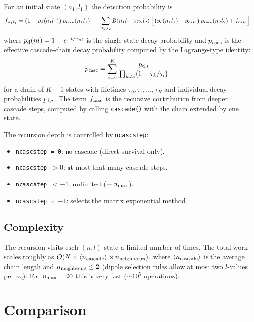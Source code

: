 \documentclass[11pt,a4paper]{article}
\begin{document}
For an initial state $(n_1,l_1)$ the detection probability is
\begin{equation}
  f_{n_1 l_1} = \bigl(1 - p_{\rm d}(n_1 l_1)\bigr)\,p_{\rm surv}(n_1 l_1)
  \;+\; \sum_{n_2,l_2} B(n_1 l_1 \!\to\! n_2 l_2)\;
  \Bigl[\bigl(p_{\rm d}(n_1 l_1) - p_{\rm casc}\bigr)\,p_{\rm surv}(n_2 l_2)
  + f_{\rm casc}\Bigr]
  \label{eq:recursive}
\end{equation}
where $p_{\rm d}(nl) = 1 - e^{-t/\tau_{nl}}$ is the single-state decay
probability and $p_{\rm casc}$ is the effective cascade-chain decay
probability computed by the Lagrange-type identity:
\begin{equation}
  p_{\rm casc} = \sum_{i=0}^{K} \frac{p_{{\rm d},i}}
  {\prod_{k \ne i}\bigl(1 - \tau_k/\tau_i\bigr)}
  \label{eq:pcasc}
\end{equation}
for a chain of $K{+}1$ states with lifetimes $\tau_0, \tau_1, \ldots,
\tau_K$ and individual decay probabilities $p_{{\rm d},i}$.
The term $f_{\rm casc}$ is the recursive contribution from deeper cascade
steps, computed by calling \texttt{cascade()} with the chain extended by
one state.

The recursion depth is controlled by \texttt{ncascstep}:
\begin{itemize}
\item \texttt{ncascstep = 0}: no cascade (direct survival only).
\item \texttt{ncascstep $> 0$}: at most that many cascade steps.
\item \texttt{ncascstep $< -1$}: unlimited ($= n_{\rm max}$).
\item \texttt{ncascstep = $-1$}: selects the matrix exponential method.
\end{itemize}

\subsection{Complexity}

The recursion visits each $(n,l)$ state a limited number of times.
The total work scales roughly as $O(N \times \langle n_{\rm cascade}\rangle
\times n_{\rm neighbours})$, where $\langle n_{\rm cascade}\rangle$ is the
average chain length and $n_{\rm neighbours} \le 2$ (dipole selection
rules allow at most two $l$-values per $n_2$).  For $n_{\rm max} = 20$
this is very fast ($\sim 10^5$ operations).

\section{Comparison}
\end{document}
